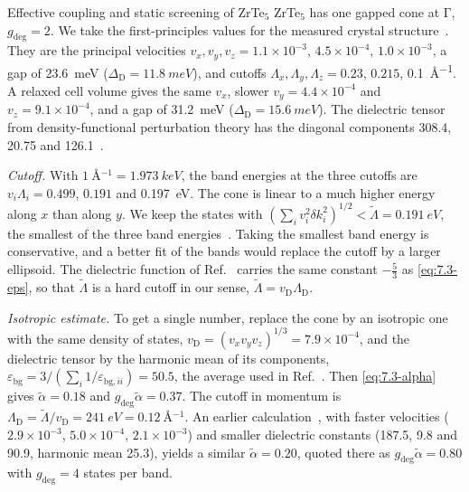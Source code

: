 \begin{workedexample}{Effective coupling and static screening of ZrTe$_5$}\label{we:7-zrte5}
ZrTe$_5$ has one gapped cone at $\mathrm{\Gamma}$, $g_{\mathrm{deg}} = 2$. We take the first-principles values for the measured crystal structure~\cite[Table~1 and text below it]{geilhufe2020dirac}. They are the principal velocities $v_x, v_y, v_z = 1.1\times10^{-3}$, $4.5\times10^{-4}$, $1.0\times10^{-3}$, a gap of \SI{23.6}{meV} ($\Delta_{\mathrm{D}} = \SI{11.8}{meV}$), and cutoffs $\Lambda_x, \Lambda_y, \Lambda_z = 0.23$, $0.215$, \SI{0.1}{\angstrom^{-1}}. A relaxed cell volume gives the same $v_x$, slower $v_y = 4.4\times10^{-4}$ and $v_z = 9.1\times10^{-4}$, and a gap of \SI{31.2}{meV} ($\Delta_{\mathrm{D}} = \SI{15.6}{meV}$). The dielectric tensor from density-functional perturbation theory has the diagonal components 308.4, 20.75 and 126.1~\cite[Table~2]{geilhufe2020dirac}.

\emph{Cutoff.} With $\SI{1}{\angstrom^{-1}} = \SI{1.973}{keV}$, the band energies at the three cutoffs are $v_i\Lambda_i = 0.499$, $0.191$ and \SI{0.197}{eV}. The cone is linear to a much higher energy along $x$ than along $y$. We keep the states with $(\sum_iv_i^2\delta k_i^2)^{1/2} < \tilde\Lambda = \SI{0.191}{eV}$, the smallest of the three band energies~\cite[Eq.~(2.21)]{geilhufe2020dirac}. Taking the smallest band energy is conservative, and a better fit of the bands would replace the cutoff by a larger ellipsoid. The dielectric function of Ref.~\cite[Eq.~(3.10)]{geilhufe2020dirac} carries the same constant $-\frac53$ as \cref{eq:7.3-eps}, so that $\tilde\Lambda$ is a hard cutoff in our sense, $\tilde\Lambda = v_{\mathrm{D}}\Lambda_{\mathrm{D}}$.

\emph{Isotropic estimate.} To get a single number, replace the cone by an isotropic one with the same density of states, $v_{\mathrm{D}} = (v_xv_yv_z)^{1/3} = 7.9\times10^{-4}$, and the dielectric tensor by the harmonic mean of its components, $\varepsilon_{\mathrm{bg}} = 3/(\sum_i1/\varepsilon_{\mathrm{bg},ii}) = 50.5$, the average used in Ref.~\cite{hochberg2018detection}. Then \cref{eq:7.3-alpha} gives $\tilde\alpha = 0.18$ and $g_{\mathrm{deg}}\tilde\alpha = 0.37$. The cutoff in momentum is $\Lambda_{\mathrm{D}} = \tilde\Lambda/v_{\mathrm{D}} = \SI{241}{eV} = \SI{0.12}{\angstrom^{-1}}$. An earlier calculation~\cite[Table~1]{hochberg2018detection}, with faster velocities ($2.9\times10^{-3}$, $5.0\times10^{-4}$, $2.1\times10^{-3}$) and smaller dielectric constants (187.5, 9.8 and 90.9, harmonic mean 25.3), yields a similar $\tilde\alpha = 0.20$, quoted there as $g_{\mathrm{deg}}\tilde\alpha = 0.80$ with $g_{\mathrm{deg}} = 4$ states per band.


\end{workedexample}
